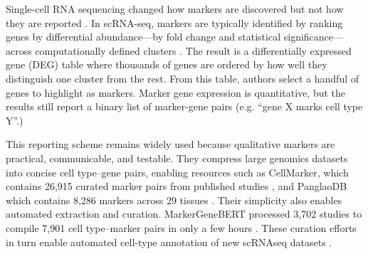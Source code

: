 \documentclass[10pt,twocolumn]{article}
\theoremstyle{plain}
\theoremstyle{definition}
\theoremstyle{remark}
\begin{document}
Single-cell RNA sequencing changed how markers are discovered but not how they are reported \citep{Tang_2009,Macosko_2015}. In scRNA-seq, markers are typically identified by ranking genes by differential abundance---by fold change and statistical significance---across computationally defined clusters \citep{Stuart_2019,Wolf_2018}. The result is a differentially expressed gene (DEG) table where thousands of genes are ordered by how well they distinguish one cluster from the rest. From this table, authors select a handful of genes to highlight as markers. Marker gene expression is quantitative, but the results still report a binary list of marker-gene pairs (e.g. ``gene X marks cell type Y''.) 

This reporting scheme remains widely used because qualitative markers are practical, communicable, and testable. They compress large genomics datasets into concise cell type--gene pairs, enabling resources such as CellMarker, which contains 26{,}915 curated marker pairs from published studies \citep{Hu2022CellMarker}, and PanglaoDB which contains 8,286 markers across 29 tissues \citep{Franzn_2019}. Their simplicity also enables automated extraction and curation. MarkerGeneBERT processed 3{,}702 studies to compile 7{,}901 cell type--marker pairs in only a few hours \citep{Cheng_2024}. These curation efforts in turn enable automated cell-type annotation of new scRNAseq datasets \citep{Dominguez2022celltypist}.
\end{document}
